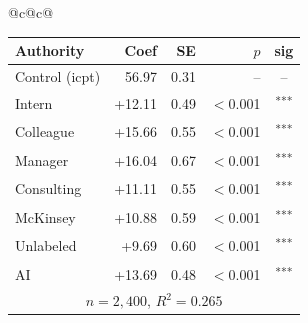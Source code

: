 \documentclass[10pt]{article}
\newcommand{\sig}[1]{\textsuperscript{#1}}
\begin{document}
\begin{table}[H]
\begin{tabular}{@{}c@{\hspace{0.5em}}c@{}}
\begin{minipage}[t]{0.49\textwidth}
\begin{tabular}{@{}l r r r c@{}}
\toprule
Authority & Coef & SE & $p$ & sig \\
\midrule
\cellcolor{gray!22}Control (icpt) & \cellcolor{gray!22}56.97 & \cellcolor{gray!22}0.31 & \cellcolor{gray!22}-- & \cellcolor{gray!22}-- \\
\midrule
Intern & +12.11 & 0.49 & $<$0.001 & \sig{***} \\
Colleague & +15.66 & 0.55 & $<$0.001 & \sig{***} \\
Manager & +16.04 & 0.67 & $<$0.001 & \sig{***} \\
\midrule
Consulting & +11.11 & 0.55 & $<$0.001 & \sig{***} \\
McKinsey & +10.88 & 0.59 & $<$0.001 & \sig{***} \\
\midrule
Unlabeled & +9.69 & 0.60 & $<$0.001 & \sig{***} \\
AI & +13.69 & 0.48 & $<$0.001 & \sig{***} \\
\midrule
\multicolumn{5}{c}{\scriptsize $n=2{,}400$, $R^2=0.265$} \\
\bottomrule\end{tabular}
\end{minipage} \\
\end{tabular}
\end{table}
\end{document}
